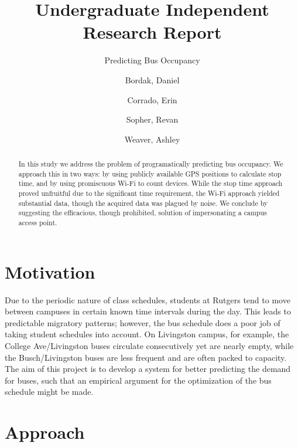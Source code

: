 \documentclass[letterpaper,abstract=on,titlepage=false]{scrreprt}
\begin{document}
\title{Undergraduate Independent Research Report}
\subtitle{Predicting Bus Occupancy}
\author{
Bordak, Daniel
\and
Corrado, Erin
\and
Sopher, Revan
\and
Weaver, Ashley
}

\maketitle

\begin{abstract}
In this study we address the problem of programatically predicting bus occupancy.
We approach this in two ways: by using publicly available GPS positions to calculate stop time, and by using promiscuous Wi-Fi to count devices.
While the stop time approach proved unfruitful due to the significant time requirement, the Wi-Fi approach yielded substantial data, though the acquired data was plagued by noise.
We conclude by suggesting the efficacious, though prohibited, solution of impersonating a campus access point.
\end{abstract}

\section*{Motivation}

Due to the periodic nature of class schedules, students at Rutgers tend to move between campuses in certain known time intervals during the day.
This leads to predictable migratory patterns; however, the bus schedule does a poor job of taking student schedules into account. 
On Livingston campus, for example, the College Ave/Livingston buses circulate consecutively yet are nearly empty, while the Busch/Livingston buses are less frequent and are often packed to capacity.
The aim of this project is to develop a system for better predicting the demand for buses, such that an empirical argument for the optimization of the bus schedule might be made.

\section*{Approach}
\end{document}
